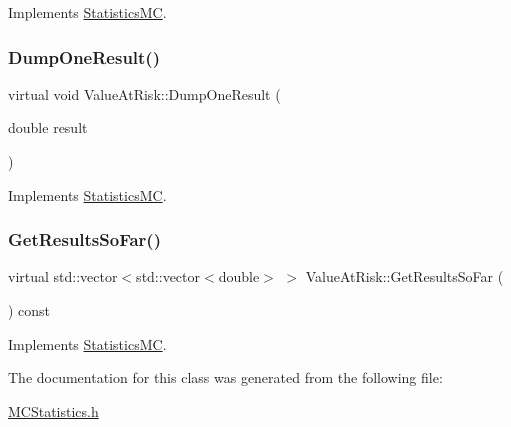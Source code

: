 Implements \hyperlink{classStatisticsMC_af716d17e088d36f283e112ba736f8002}{Statistics\+MC}.

\hypertarget{classValueAtRisk_ad61f71fb24d6b6f4825e813137d4ef73}{}\label{classValueAtRisk_ad61f71fb24d6b6f4825e813137d4ef73} 
\subsubsection{\texorpdfstring{Dump\+One\+Result()}{DumpOneResult()}}
{\footnotesize\ttfamily virtual void Value\+At\+Risk\+::\+Dump\+One\+Result (\begin{DoxyParamCaption}\item[{double}]{result }\end{DoxyParamCaption})\hspace{0.3cm}{\ttfamily [virtual]}}



Implements \hyperlink{classStatisticsMC_a3ab5fb27d6933d8e35b2a55c3897cbe3}{Statistics\+MC}.

\hypertarget{classValueAtRisk_a1ff78542a90e27d895382a9ea2169b6d}{}\label{classValueAtRisk_a1ff78542a90e27d895382a9ea2169b6d} 
\subsubsection{\texorpdfstring{Get\+Results\+So\+Far()}{GetResultsSoFar()}}
{\footnotesize\ttfamily virtual std\+::vector$<$std\+::vector$<$double$>$ $>$ Value\+At\+Risk\+::\+Get\+Results\+So\+Far (\begin{DoxyParamCaption}{ }\end{DoxyParamCaption}) const\hspace{0.3cm}{\ttfamily [virtual]}}



Implements \hyperlink{classStatisticsMC_ae29a294b6db36c2bf46c20ac30e25aad}{Statistics\+MC}.



The documentation for this class was generated from the following file\+:\begin{DoxyCompactItemize}
\item 
\hyperlink{MCStatistics_8h}{M\+C\+Statistics.\+h}\end{DoxyCompactItemize}
